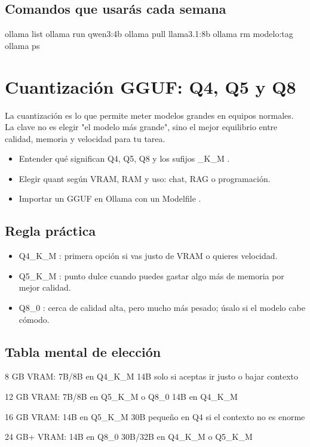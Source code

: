 \documentclass[11pt,a4paper]{book}
\begin{document}
\section{Comandos que usarás cada semana}
\begin{codebox}
ollama list
ollama run qwen3:4b
ollama pull llama3.1:8b
ollama rm modelo:tag
ollama ps
\end{codebox}
\chapter{Cuantización GGUF: Q4, Q5 y Q8}
La cuantización es lo que permite meter modelos grandes en equipos normales. La clave no es elegir "el modelo más grande", sino el mejor equilibrio entre calidad, memoria y velocidad para tu tarea.

\begin{itemize}\item Entender qué significan Q4, Q5, Q8 y los sufijos \_K\_M .\end{itemize}
\begin{itemize}\item Elegir quant según VRAM, RAM y uso: chat, RAG o programación.\end{itemize}
\begin{itemize}\item Importar un GGUF en Ollama con un Modelfile .\end{itemize}
\section{Regla práctica}
\begin{itemize}\item Q4\_K\_M : primera opción si vas justo de VRAM o quieres velocidad.\end{itemize}
\begin{itemize}\item Q5\_K\_M : punto dulce cuando puedes gastar algo más de memoria por mejor calidad.\end{itemize}
\begin{itemize}\item Q8\_0 : cerca de calidad alta, pero mucho más pesado; úsalo si el modelo cabe cómodo.\end{itemize}
\section{Tabla mental de elección}
\begin{codebox}
8 GB VRAM:
  7B/8B en Q4_K_M
  14B solo si aceptas ir justo o bajar contexto

12 GB VRAM:
  7B/8B en Q5_K_M o Q8_0
  14B en Q4_K_M

16 GB VRAM:
  14B en Q5_K_M
  30B pequeño en Q4 si el contexto no es enorme

24 GB+ VRAM:
  14B en Q8_0
  30B/32B en Q4_K_M o Q5_K_M
\end{codebox}
\end{document}
